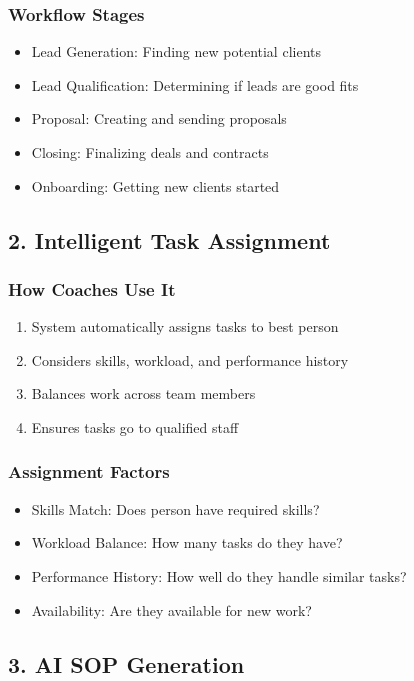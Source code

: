 \documentclass[12pt,a4paper]{article}
\begin{document}
\subsubsection{Workflow Stages}
\begin{itemize}
    \item Lead Generation: Finding new potential clients
    \item Lead Qualification: Determining if leads are good fits
    \item Proposal: Creating and sending proposals
    \item Closing: Finalizing deals and contracts
    \item Onboarding: Getting new clients started
\end{itemize}

\subsection{2. Intelligent Task Assignment}

\subsubsection{How Coaches Use It}
\begin{enumerate}
    \item System automatically assigns tasks to best person
    \item Considers skills, workload, and performance history
    \item Balances work across team members
    \item Ensures tasks go to qualified staff
\end{enumerate}

\subsubsection{Assignment Factors}
\begin{itemize}
    \item Skills Match: Does person have required skills?
    \item Workload Balance: How many tasks do they have?
    \item Performance History: How well do they handle similar tasks?
    \item Availability: Are they available for new work?
\end{itemize}

\subsection{3. AI SOP Generation}
\end{document}
